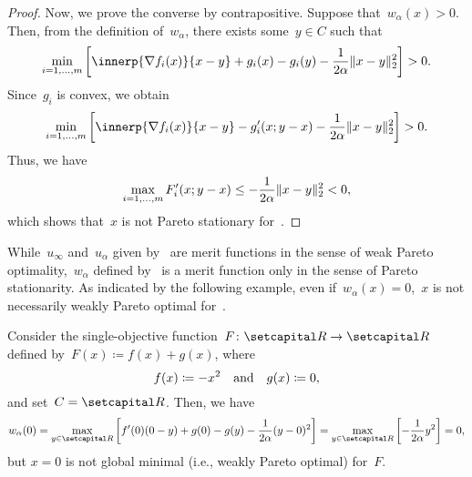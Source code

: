 \documentclass[../../main]{subfiles}
\begin{document}
\begin{proof}
    Now, we prove the converse by contrapositive.
    Suppose that~$w_\alpha(x) > 0$.
    Then, from the definition of~$w_\alpha$, there exists some~$y \in C$ such that
    \begin{equation}
        \min_{i = 1, \dots, m} \left[ \innerp{\nabla f_i(x)}{x - y} + g_i(x) - g_i(y) - \frac{1}{2 \alpha} \norm{x - y}_2^2 \right] > 0
        .\end{equation}
    Since~$g_i$ is convex, we obtain
    \begin{equation}
        \min_{i = 1, \dots, m} \left[ \innerp{\nabla f_i(x)}{x - y} - g_i'(x; y - x) - \frac{1}{2 \alpha} \norm{x - y}_2^2 \right] > 0
        .\end{equation}
    Thus, we have
    \begin{equation}
        \max_{i = 1, \dots, m} F_i'(x; y - x) \le - \frac{1}{2 \alpha} \lVert x - y\rVert_2^2 < 0
        ,\end{equation}
    which shows that~$x$ is not Pareto stationary for~.
\end{proof}
While~$u_\infty$ and~$u_\alpha$ given by~ are merit functions in the sense of weak Pareto optimality,~$w_\alpha$ defined by~ is a merit function only in the sense of Pareto stationarity.
As indicated by the following example, even if~$w_\alpha(x) = 0$,~$x$ is not necessarily weakly Pareto optimal for~.
\begin{example}
    Consider the single-objective function~$F\colon \setR \to \setR$ defined by~$F(x) \coloneqq f(x) + g(x)$, where
    \begin{equation}
        f(x) \coloneqq - x^2 \quad \text{and} \quad g(x) \coloneqq 0
        ,\end{equation}
    and set~$C = \setR$.
    Then, we have
    \begin{equation}
        w_\alpha(0) = \max_{y \in \setR} \left[ f'(0) (0 - y) + g(0) - g(y) - \frac{1}{2 \alpha} (y - 0)^2 \right]
        = \max_{y \in \setR} \left[ - \frac{1}{2 \alpha} y^2 \right] = 0
        ,\end{equation}
    but $x = 0$ is not global minimal (i.e., weakly Pareto optimal) for~$F$.
\end{example}
\end{document}
